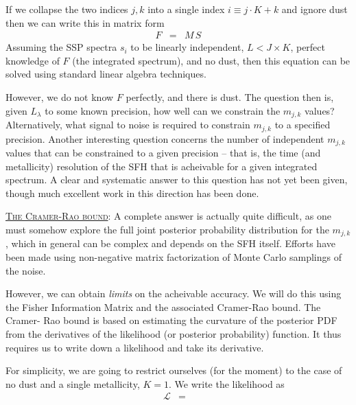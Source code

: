 \documentclass{article}
\begin{document}
If we collapse the two indices $j, k$ into a single index $i \equiv j\cdot K + k$ and ignore dust then we can write this in matrix form
\begin{eqnarray}
F & = & M \, S
\end{eqnarray}
Assuming the SSP spectra $s_{i}$ to be linearly independent, $L < J\times K$, perfect knowledge of $F$ (the integrated spectrum), and no dust, 
then this equation can be solved using standard linear algebra techniques.

However, we do not know $F$ perfectly, and there is dust. 
The question then is, given $L_\lambda$ to some known precision, how well can we constrain the $m_{j,k}$ values? 
Alternatively, what signal to noise is required to constrain $m_{j,k}$ to a specified precision. 
Another interesting question concerns the number of independent $m_{j,k}$ values that can be constrained to a given precision -- 
that is, the time (and metallicity) resolution of the SFH that is acheivable for a given integrated spectrum.
A clear and systematic answer to this question has not yet been given, though much excellent work in this direction has been done.


\underline{\textsc{The Cramer-Rao bound}}:
A complete answer is actually quite difficult, as one must somehow explore the full joint posterior probability distribution for the $m_{j,k}$, 
which in general can be complex and depends on the SFH itself.
Efforts have been made using non-negative matrix factorization of Monte Carlo samplings of the noise.

However, we can obtain \emph{limits} on the acheivable accuracy.  
We will do this using the Fisher Information Matrix and the associated Cramer-Rao bound.
The Cramer- Rao bound is based on estimating the curvature of the posterior PDF from the derivatives of the likelihood (or posterior probability) function.
It thus requires us to write down a likelihood and take its derivative.

For simplicity, we are going to restrict ourselves (for the moment) to the case of no dust and a single metallicity, $K=1$.
We write the likelihood as 
\begin{eqnarray}
\mathcal{L} & = & 
\end{eqnarray}
\end{document}
